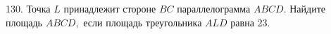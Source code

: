 130. Точка $L$ принадлежит стороне $BC$ параллелограмма $ABCD.$ Найдите площадь $ABCD,$ если площадь треугольника $ALD$ равна 23.\\

